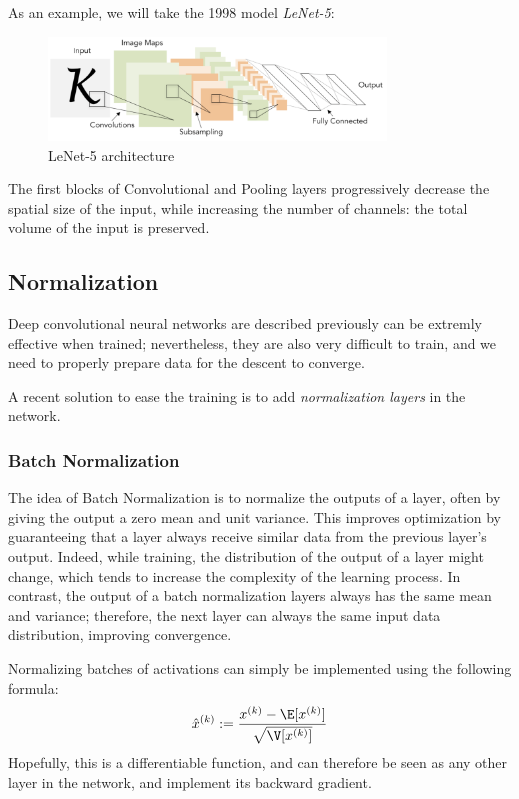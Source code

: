 As an example, we will take the 1998 model \emph{LeNet-5}:
\begin{figure}[H]
    \centering
    \includegraphics[width=0.8\textwidth]{images/lenet-5.png}
    \caption{LeNet-5 architecture}
\end{figure}
The first blocks of Convolutional and Pooling layers progressively decrease the spatial size of the input, while increasing the number of channels: the total volume of the input is preserved.

\subsection{Normalization}
Deep convolutional neural networks are described previously can be extremly effective when trained; nevertheless, they are also very difficult to train, and we need to properly prepare data for the descent to converge.

A recent solution to ease the training is to add \emph{normalization layers} in the network.

\subsubsection{Batch Normalization}
The idea of Batch Normalization is to normalize the outputs of a layer, often by giving the output a zero mean and unit variance. This improves optimization by guaranteeing that a layer always receive similar data from the previous layer's output. Indeed, while training, the distribution of the output of a layer might change, which tends to increase the complexity of the learning process. In contrast, the output of a batch normalization layers always has the same mean and variance; therefore, the next layer can always  the same input data distribution, improving convergence.

Normalizing batches of activations can simply be implemented using the following formula:
\begin{equation*}
    \hat{x}^{(k)} := \frac{x^{(k)} - \E[x^{(k)}]}{\sqrt{\V[x^{(k)}]}}
\end{equation*}
Hopefully, this is a differentiable function, and can therefore be seen as any other layer in the network, and implement its backward gradient.


